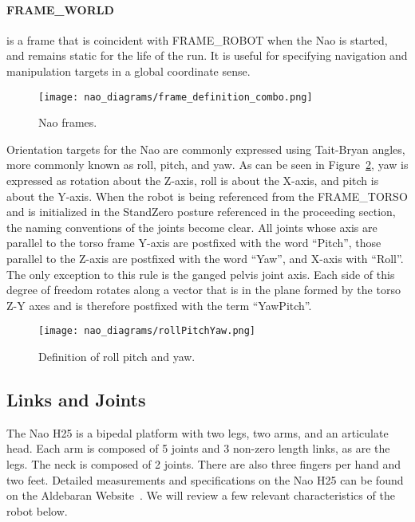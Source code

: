 \paragraph{FRAME\_WORLD}
is a frame that is coincident with FRAME\_ROBOT when the Nao is started,
and remains static for the life of the run. It is useful for specifying navigation
and manipulation targets in a global coordinate sense.

\begin{figure}[H]
\centering
\texttt{[image: nao\_diagrams/frame\_definition\_combo.png]}
\caption{Nao frames.}
\label{fig:nao_frames1}
\end{figure}

Orientation targets for the Nao are commonly expressed using Tait-Bryan angles,
more commonly known as roll, pitch, and yaw. As can be seen in
Figure~\ref{fig:nao_rpy_def1}, yaw is expressed as rotation about the Z-axis,
roll is about the X-axis, and pitch is about the Y-axis.
When the robot is being referenced from the FRAME\_TORSO and is
initialized in the StandZero posture referenced in the proceeding section,
the naming conventions of the joints become clear. All joints whose axis
are parallel to the torso frame Y-axis are postfixed with the word ``Pitch'',
those parallel to the Z-axis are postfixed with the word ``Yaw'', and X-axis
with ``Roll''. The only exception to this rule is the ganged pelvis joint
axis. Each side of this degree of freedom rotates along a vector that is
in the plane formed by the torso Z-Y axes and is therefore postfixed with the
term ``YawPitch''.

\begin{figure}
\centerline{\texttt{[image: nao\_diagrams/rollPitchYaw.png]}
}
\caption{Definition of roll pitch and yaw.}
\label{fig:nao_rpy_def1}
\end{figure}


\subsection{Links and Joints}
The Nao H25 is a bipedal platform with two legs, two arms, and an articulate
head. Each arm is composed of 5 joints and 3 non-zero length links, as are 
the legs. The neck is composed of 2 joints. 
There are also three fingers per hand and two feet. 
Detailed measurements and specifications on the
Nao H25 can be found on the Aldebaran Website~\cite{nao_docs_h25}.
We will review a few relevant characteristics of the robot below.

